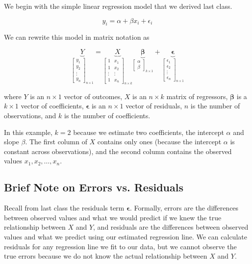 \documentclass[12pt]{article}
\begin{document}
We begin with the simple linear regression model that we derived last class.

\begin{equation}
    y_i = \alpha + \beta x_i + \epsilon_i
\end{equation}


We can rewrite this model in matrix notation as

\[
\underbrace{Y}_{
\begin{bmatrix}
y_1 \\ y_2 \\ \vdots \\ y_n
\end{bmatrix}_{n \times 1}
}
=
\underbrace{X}_{
\begin{bmatrix}
1 & x_1 \\
1 & x_2 \\
\vdots & \vdots \\
1 & x_n
\end{bmatrix}_{n \times k}
}
\underbrace{\boldsymbol{\beta}}_{
\begin{bmatrix}
\alpha \\ \beta
\end{bmatrix}_{k \times 1}
}
+
\underbrace{\boldsymbol{\epsilon}}_{
\begin{bmatrix}
\epsilon_1 \\ \epsilon_2 \\ \vdots \\ \epsilon_n
\end{bmatrix}_{n \times 1}
}
\]


where $Y$ is an $n \times 1$ vector of outcomes, $X$ is an $n \times k$ matrix of regressors, $\boldsymbol{\beta}$ is a $k \times 1$ vector of coefficients,  $\boldsymbol{\epsilon}$ is an $n \times 1$ vector of residuals, $n$ is the number of observations, and $k$ is the number of coefficients.

In this example, $k=2$ because we estimate two coefficients,
the intercept $\alpha$ and slope $\beta$. The first column of $X$ contains only ones (because
the intercept $\alpha$ is constant across observations),
and the second column contains the observed values $x_1,x_2,\ldots,x_n$.

\subsection{Brief Note on Errors vs. Residuals}

Recall from last class the residuals term $\boldsymbol{\epsilon}$. Formally, errors are the differences between observed values and what we would predict if we knew the true relationship between $X$ and $Y$, and residuals are the differences between observed values
and what we predict using our estimated regression line. We can calculate residuals for any regression line we fit to our data, but we cannot observe the true errors because we do not know the actual relationship between $X$ and $Y$. 
\end{document}
